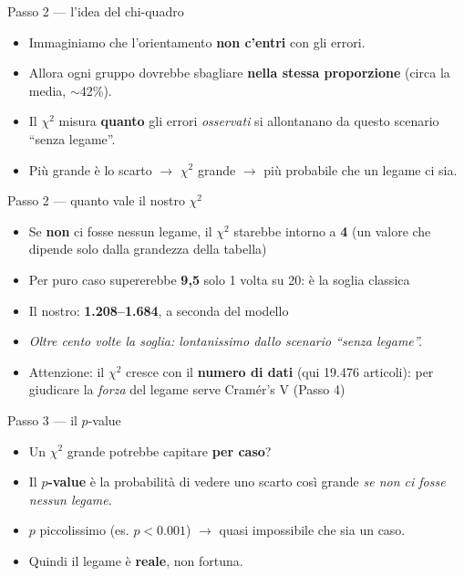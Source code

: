 \documentclass[aspectratio=169]{beamer}
\newcommand{\hl}[1]{\textbf{#1}}
\begin{document}
\begin{frame}{Passo 2 --- l'idea del chi-quadro}
  \vfill
  \begin{itemize}[<+->]
    \setlength\itemsep{0.9em}
    \item Immaginiamo che l'orientamento \hl{non c'entri} con gli errori.
    \item Allora ogni gruppo dovrebbe sbagliare \hl{nella stessa proporzione} (circa la media, $\sim$42\%).
    \item Il $\chi^2$ misura \hl{quanto} gli errori \emph{osservati} si allontanano da questo scenario ``senza legame''.
    \item Pi\`u grande \`e lo scarto $\rightarrow$ $\chi^2$ grande $\rightarrow$ pi\`u probabile che un legame ci sia.
  \end{itemize}
  \vfill
\end{frame}

\begin{frame}{Passo 2 --- quanto vale il nostro $\chi^2$}
  \vfill
  \begin{itemize}[<+->]
    \setlength\itemsep{0.8em}
    \item Se \hl{non} ci fosse nessun legame, il $\chi^2$ starebbe intorno a \hl{4} (un valore che dipende solo dalla grandezza della tabella)
    \item Per puro caso supererebbe \hl{9,5} solo 1 volta su 20: \`e la soglia classica
    \item Il nostro: \hl{1.208--1.684}, a seconda del modello
    \item[] {\small\itshape Oltre cento volte la soglia: lontanissimo dallo scenario ``senza legame''.}
    \item Attenzione: il $\chi^2$ cresce con il \hl{numero di dati} (qui 19.476 articoli): per giudicare la \emph{forza} del legame serve Cram\'er's V (Passo 4)
  \end{itemize}
  \vfill
\end{frame}

\begin{frame}{Passo 3 --- il $p$-value}
  \vfill
  \begin{itemize}[<+->]
    \setlength\itemsep{0.9em}
    \item Un $\chi^2$ grande potrebbe capitare \hl{per caso}?
    \item Il \hl{$p$-value} \`e la probabilit\`a di vedere uno scarto cos\`i grande \emph{se non ci fosse nessun legame}.
    \item $p$ piccolissimo (es. $p<0.001$) $\rightarrow$ quasi impossibile che sia un caso.
    \item Quindi il legame \`e \hl{reale}, non fortuna.
  \end{itemize}
  \vfill
\end{frame}
\end{document}
